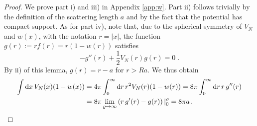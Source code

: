 \documentclass[11pt]{article}
\newcommand{\rd}{{\rm d}}
\begin{document}
\begin{proof}
We prove part i) and iii) in Appendix \ref{app:w}. Part ii) follows
trivially by the definition of the scattering length $a$ and by the
fact that the potential has compact support. As for part iv), note
that, due to the spherical symmetry of $V_N$ and $w(x)$, with the
notation $r =|x|$, the function $g(r):= r f(r) = r(1-w(r))$
satisfies
\[
- g'' (r) +
\frac{1}{2} V_N (r) g(r) = 0 \; .
\]
By ii) of this lemma, $g(r) = r-a$ for $r >Ra$.  We thus
obtain
\begin{equation}
\begin{split} \int \rd x \, V_N (x) (1-w(x)) &= 4\pi \int_0^{\infty}
\rd r \, r^2 V_N (r) (1-w(r)) = 8\pi \int_0^{\infty} \rd r \, r \,
g'' (r) \\ &= 8\pi \lim_{ \varrho \to \infty} \left( r \, g' (r) -
g(r) \right) |_0^{\varrho} = 8 \pi a \,.\end{split}
\end{equation}
\end{proof}


\medskip
\end{document}
